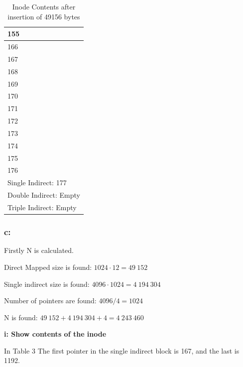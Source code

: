 \documentclass[11pt,a4paper]{article}
\theoremstyle{plain}
\theoremstyle{definition}
\theoremstyle{remark}
\numberwithin{equation}{section}
\begin{document}
\begin{table}[]
    \centering
    \caption{Inode Contents after insertion of 49156 bytes}
    \label{my-label}
    \begin{tabular}{|l|}
        \hline
        155                    \\ \hline
        166                    \\ \hline
        167                  \\ \hline
        168                  \\ \hline
        169                  \\ \hline
        170                  \\ \hline
        171                  \\ \hline
        172                  \\ \hline
        173                  \\ \hline
        174                  \\ \hline
        175                  \\ \hline
        176                  \\ \hline
        Single Indirect: 177 \\ \hline
        Double Indirect: Empty \\ \hline
        Triple Indirect: Empty \\ \hline
    \end{tabular}
\end{table}

\subsubsection*{c: }

Firstly N is calculated.

Direct Mapped size is found: $ 1024 \cdot 12 = 49\:152 $

Single indirect size is found: $ 4096 \cdot 1024 = 4\:194\:304 $

Number of pointers are found: $ 4096 / 4 = 1024 $

N is found: $ 49\:152 + 4\:194\:304 + 4 = 4\:243\:460$

\textbf{i: Show contents of the inode}

In Table 3 The first pointer in the single indirect block is 167, and the last is 1192.
\end{document}
